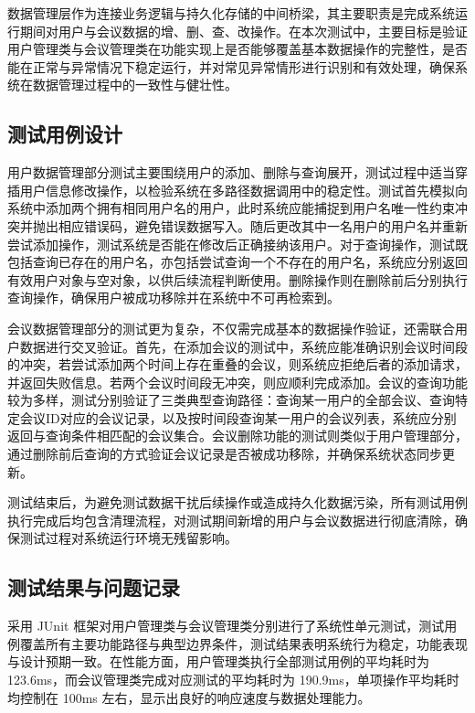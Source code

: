 \documentclass[a4paper, twoside, utf8]{ctexart}
\begin{document}
    数据管理层作为连接业务逻辑与持久化存储的中间桥梁，其主要职责是完成系统运行期间对用户与会议数据的增、删、查、改操作。在本次测试中，主要目标是验证用户管理类与会议管理类在功能实现上是否能够覆盖基本数据操作的完整性，是否能在正常与异常情况下稳定运行，并对常见异常情形进行识别和有效处理，确保系统在数据管理过程中的一致性与健壮性。

    \subsection{测试用例设计}

    用户数据管理部分测试主要围绕用户的添加、删除与查询展开，测试过程中适当穿插用户信息修改操作，以检验系统在多路径数据调用中的稳定性。测试首先模拟向系统中添加两个拥有相同用户名的用户，此时系统应能捕捉到用户名唯一性约束冲突并抛出相应错误码，避免错误数据写入。随后更改其中一名用户的用户名并重新尝试添加操作，测试系统是否能在修改后正确接纳该用户。对于查询操作，测试既包括查询已存在的用户名，亦包括尝试查询一个不存在的用户名，系统应分别返回有效用户对象与空对象，以供后续流程判断使用。删除操作则在删除前后分别执行查询操作，确保用户被成功移除并在系统中不可再检索到。

    会议数据管理部分的测试更为复杂，不仅需完成基本的数据操作验证，还需联合用户数据进行交叉验证。首先，在添加会议的测试中，系统应能准确识别会议时间段的冲突，若尝试添加两个时间上存在重叠的会议，则系统应拒绝后者的添加请求，并返回失败信息。若两个会议时间段无冲突，则应顺利完成添加。会议的查询功能较为多样，测试分别验证了三类典型查询路径：查询某一用户的全部会议、查询特定会议ID对应的会议记录，以及按时间段查询某一用户的会议列表，系统应分别返回与查询条件相匹配的会议集合。会议删除功能的测试则类似于用户管理部分，通过删除前后查询的方式验证会议记录是否被成功移除，并确保系统状态同步更新。

    测试结束后，为避免测试数据干扰后续操作或造成持久化数据污染，所有测试用例执行完成后均包含清理流程，对测试期间新增的用户与会议数据进行彻底清除，确保测试过程对系统运行环境无残留影响。

    \subsection{测试结果与问题记录}

    采用 JUnit 框架对用户管理类与会议管理类分别进行了系统性单元测试，测试用例覆盖所有主要功能路径与典型边界条件，测试结果表明系统行为稳定，功能表现与设计预期一致。在性能方面，用户管理类执行全部测试用例的平均耗时为 123.6ms，而会议管理类完成对应测试的平均耗时为 190.9ms，单项操作平均耗时均控制在 100ms 左右，显示出良好的响应速度与数据处理能力。
\end{document}
